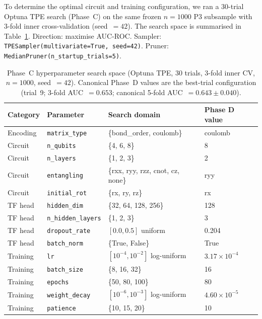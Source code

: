 To determine the optimal circuit and training configuration, we ran a
30-trial Optuna TPE\cite{akiba2019optuna} search (Phase~C) on the same
frozen $n = 1000$ P3 subsample with 3-fold inner cross-validation
(seed~$= 42$). The search space is summarised in
Table~\ref{tab:hpo_space}. Direction: maximise AUC-ROC.
Sampler: \texttt{TPESampler(multivariate=True, seed=42)}.
Pruner: \texttt{MedianPruner(n\_startup\_trials=5)}.

\begin{table}[htbp]
\centering
\caption{Phase~C hyperparameter search space (Optuna TPE, 30 trials,
3-fold inner CV, $n=1000$, seed~$=42$).
Canonical Phase~D values are the best-trial configuration
(trial~9; 3-fold AUC~$= 0.653$; canonical 5-fold AUC~$= 0.643 \pm 0.040$).}
\label{tab:hpo_space}
\begin{tabular}{llll}
\toprule
Category & Parameter & Search domain & Phase D value \\
\midrule
Encoding  & \texttt{matrix\_type}   & \{bond\_order, coulomb\}          & coulomb \\
Circuit   & \texttt{n\_qubits}      & \{4, 6, 8\}                       & 8 \\
Circuit   & \texttt{n\_layers}      & \{1, 2, 3\}                       & 2 \\
Circuit   & \texttt{entangling}     & \{rxx, ryy, rzz, cnot, cz, none\} & ryy \\
Circuit   & \texttt{initial\_rot}   & \{rx, ry, rz\}                    & rx \\
TF head   & \texttt{hidden\_dim}    & \{32, 64, 128, 256\}              & 128 \\
TF head   & \texttt{n\_hidden\_layers} & \{1, 2, 3\}                   & 3 \\
TF head   & \texttt{dropout\_rate}  & $[0.0, 0.5]$ uniform             & 0.204 \\
TF head   & \texttt{batch\_norm}    & \{True, False\}                   & True \\
Training  & \texttt{lr}             & $[10^{-4}, 10^{-2}]$ log-uniform  & $3.17\times10^{-4}$ \\
Training  & \texttt{batch\_size}    & \{8, 16, 32\}                     & 16 \\
Training  & \texttt{epochs}         & \{50, 80, 100\}                   & 80 \\
Training  & \texttt{weight\_decay}  & $[10^{-6}, 10^{-3}]$ log-uniform  & $4.60\times10^{-5}$ \\
Training  & \texttt{patience}       & \{10, 15, 20\}                    & 10 \\
\bottomrule
\end{tabular}
\end{table}

